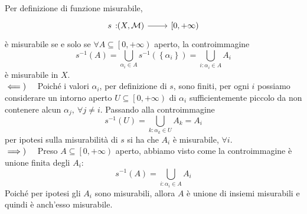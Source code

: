 \begin{demonstration}
	Per definizione di funzione misurabile,
	\begin{equation*}
		\funz{s}{\left(X,\mathcal{M}\right)}{\left[0,+\infty\right)}
	\end{equation*}
	è misurabile se e solo se $\forall A\subseteq\left[0,+\infty\right)$ aperto, la controimmagine
	\begin{equation*}
		s^{-1}\left(A\right)=\bigcup_{\alpha_i\in A}s^{-1}\left(\left\{\alpha_i\right\}\right)=\bigcup_{i\colon \alpha_i\in A}A_i
	\end{equation*}
è misurabile in $X$.\\
$\impliedby)\quad$ Poiché i valori $\alpha_i$, per definizione di $s$, sono finiti, per ogni $i$ possiamo considerare un intorno aperto $U\subseteq \left[0,+\infty\right)$ di $\alpha_i$ sufficientemente piccolo da non contenere alcun $\alpha_j,\ \forall j\neq i$. Passando alla controimmagine
\begin{equation*}
	s^{-1}\left(U\right)=\bigcup_{k\colon \alpha_k\in U}A_k=A_i
\end{equation*}
per ipotesi sulla misurabilità di $s$ si ha che $A_i$ è misurabile, $\forall i$.\\
$\implies)\quad$ Preso $A\subseteq\left[0,+\infty\right)$ aperto, abbiamo visto come la controimmagine è unione finita degli $A_i$:
	\begin{equation*}
	s^{-1}\left(A\right)=\bigcup_{i\colon \alpha_i\in A}A_i
\end{equation*}
Poiché per ipotesi gli $A_i$ sono misurabili, allora $A$ è unione di insiemi misurabili e quindi è anch'esso misurabile.
\end{demonstration}
